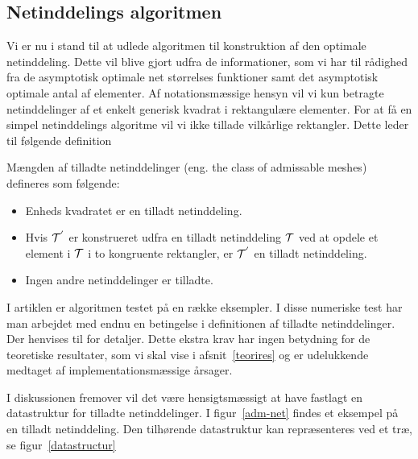 \subsection{Netinddelings algoritmen} \label{netalg}
Vi er nu i stand til at udlede algoritmen til konstruktion af den
optimale netinddeling. Dette vil blive gjort udfra de informationer,
som vi har til rådighed fra de asymptotisk optimale net størrelses
funktioner samt det asymptotisk optimale antal af elementer. Af
notationsmæssige hensyn vil vi kun betragte netinddelinger af et enkelt
generisk kvadrat i rektangulære elementer. For at få en simpel
netinddelings algoritme vil vi ikke tillade vilkårlige rektangler.
Dette leder til følgende definition
\begin{definition}
Mængden af tilladte netinddelinger (eng. the class of admissable
meshes) defineres som følgende:
\begin{itemize}
  \item Enheds kvadratet er en tilladt netinddeling.
  \item Hvis $\mathcal T^{'}$ er konstrueret udfra en tilladt netinddeling
        $\mathcal T$ ved at opdele et element i $\mathcal T$ i to kongruente 
        rektangler, er $\mathcal T^{'}$ en tilladt netinddeling. 
  \item Ingen andre netinddelinger er tilladte.
\end{itemize}
\end{definition}
\begin{remark}
I artiklen \cite{hugger-net} er algoritmen testet på en række eksempler. I
disse numeriske test har man arbejdet med endnu en betingelse i
definitionen af tilladte netinddelinger. Der henvises til \cite{hugger-net} for
detaljer. Dette ekstra krav har ingen betydning for de teoretiske
resultater, som vi skal vise i afsnit~\ref{teorires} og er udelukkende
medtaget af implementationsmæssige årsager. 
\end{remark}
I diskussionen fremover vil det være hensigtsmæssigt at have fastlagt
en datastruktur for tilladte netinddelinger. I figur~\ref{adm-net}
findes et eksempel på en tilladt netinddeling. Den tilhørende
datastruktur kan repræsenteres ved et træ, se figur~\ref{datastructur}
